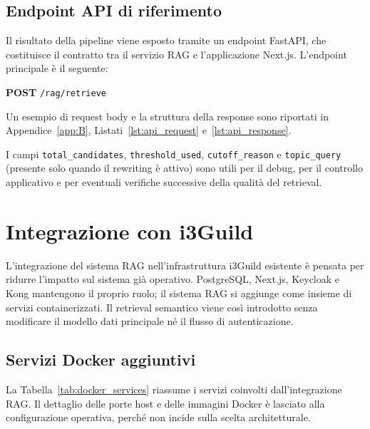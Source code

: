 \subsection{Endpoint API di riferimento}
\label{subsec:api_endpoint}

Il risultato della pipeline viene esposto tramite un endpoint FastAPI, che
costituisce il contratto tra il servizio RAG e l'applicazione Next.js.
L'endpoint principale è il seguente:

\noindent \textbf{POST} \texttt{/rag/retrieve}

Un esempio di request body e la struttura della response sono riportati in
Appendice~\ref{app:B}, Listati~\ref{lst:api_request}
e~\ref{lst:api_response}.

I campi \texttt{total\_candidates}, \texttt{threshold\_used},
\texttt{cutoff\_reason} e \texttt{topic\_query} (presente solo quando il
rewriting è attivo) sono utili per il debug, per il controllo applicativo e per
eventuali verifiche successive della qualità del retrieval.

\section{Integrazione con i3Guild}
\label{sec:i3guild_integration}

L'integrazione del sistema RAG nell'infrastruttura i3Guild esistente è pensata
per ridurre l'impatto sul sistema già operativo. PostgreSQL, Next.js, Keycloak e
Kong mantengono il proprio ruolo; il sistema RAG si aggiunge come insieme di
servizi containerizzati. Il retrieval semantico viene così introdotto senza
modificare il modello dati principale né il flusso di autenticazione.

\subsection{Servizi Docker aggiuntivi}
\label{subsec:docker_services}

La Tabella~\ref{tab:docker_services} riassume i servizi coinvolti
dall'integrazione RAG. Il dettaglio delle porte host e delle immagini Docker è
lasciato alla configurazione operativa, perché non incide sulla scelta
architetturale.

